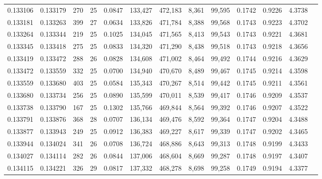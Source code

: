 \begin{tabular}{rrrrrrrrrrrrr}
0.133106 & 0.133179 & 270 &  25 &                                     0.0847 & 133,427 & 472,183 &   8,361 &  99,595 & 0.1742 & 0.9226 & 4.3738 \\
0.133181 & 0.133263 & 399 &  27 &                                     0.0634 & 133,826 & 471,784 &   8,388 &  99,568 & 0.1743 & 0.9223 & 4.3702 \\
0.133264 & 0.133344 & 219 &  25 &                                     0.1025 & 134,045 & 471,565 &   8,413 &  99,543 & 0.1743 & 0.9221 & 4.3681 \\
0.133345 & 0.133418 & 275 &  25 &                                     0.0833 & 134,320 & 471,290 &   8,438 &  99,518 & 0.1743 & 0.9218 & 4.3656 \\
0.133419 & 0.133472 & 288 &  26 &                                     0.0828 & 134,608 & 471,002 &   8,464 &  99,492 & 0.1744 & 0.9216 & 4.3629 \\
0.133472 & 0.133559 & 332 &  25 &                                     0.0700 & 134,940 & 470,670 &   8,489 &  99,467 & 0.1745 & 0.9214 & 4.3598 \\
0.133559 & 0.133680 & 403 &  25 &                                     0.0584 & 135,343 & 470,267 &   8,514 &  99,442 & 0.1745 & 0.9211 & 4.3561 \\
0.133680 & 0.133734 & 256 &  25 &                                     0.0890 & 135,599 & 470,011 &   8,539 &  99,417 & 0.1746 & 0.9209 & 4.3537 \\
0.133738 & 0.133790 & 167 &  25 &                                     0.1302 & 135,766 & 469,844 &   8,564 &  99,392 & 0.1746 & 0.9207 & 4.3522 \\
0.133791 & 0.133876 & 368 &  28 &                                     0.0707 & 136,134 & 469,476 &   8,592 &  99,364 & 0.1747 & 0.9204 & 4.3488 \\
0.133877 & 0.133943 & 249 &  25 &                                     0.0912 & 136,383 & 469,227 &   8,617 &  99,339 & 0.1747 & 0.9202 & 4.3465 \\
0.133944 & 0.134024 & 341 &  26 &                                     0.0708 & 136,724 & 468,886 &   8,643 &  99,313 & 0.1748 & 0.9199 & 4.3433 \\
0.134027 & 0.134114 & 282 &  26 &                                     0.0844 & 137,006 & 468,604 &   8,669 &  99,287 & 0.1748 & 0.9197 & 4.3407 \\
0.134115 & 0.134221 & 326 &  29 &                                     0.0817 & 137,332 & 468,278 &   8,698 &  99,258 & 0.1749 & 0.9194 & 4.3377 \\

\end{tabular}
